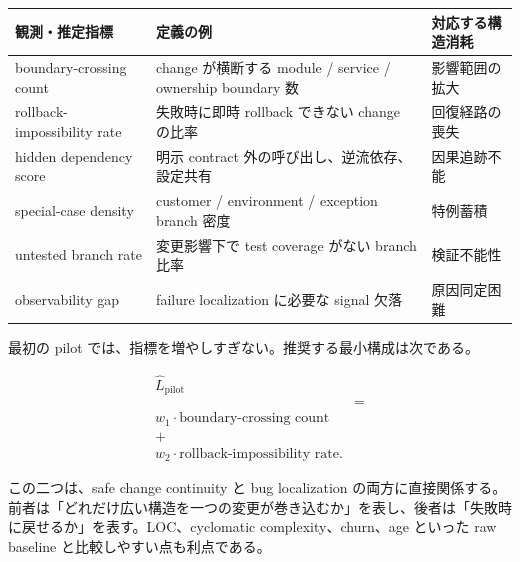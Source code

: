 \documentclass[12pt,a4paper]{article}
\begin{document}
{\def\LTcaptype{table} %
\begin{longtable}[]{@{}
  >{\raggedright\arraybackslash}p{}
  >{\raggedright\arraybackslash}p{}
  >{\raggedright\arraybackslash}p{}@{}}
\toprule\noalign{}
\begin{minipage}[b]{\linewidth}\raggedright
観測・推定指標
\end{minipage} & \begin{minipage}[b]{\linewidth}\raggedright
定義の例
\end{minipage} & \begin{minipage}[b]{\linewidth}\raggedright
対応する構造消耗
\end{minipage} \\
\midrule\noalign{}
\endhead
\bottomrule\noalign{}
\endlastfoot
boundary-crossing count & 1 change が横断する module / service / ownership boundary 数 & 影響範囲の拡大 \\
rollback-impossibility rate & 失敗時に即時 rollback できない change の比率 & 回復経路の喪失 \\
hidden dependency score & 明示 contract 外の呼び出し、逆流依存、設定共有 & 因果追跡不能 \\
special-case density & customer / environment / exception branch 密度 & 特例蓄積 \\
untested branch rate & 変更影響下で test coverage がない branch 比率 & 検証不能性 \\
observability gap & failure localization に必要な signal 欠落 & 原因同定困難 \\
\end{longtable}
}

最初の pilot では、指標を増やしすぎない。推奨する最小構成は次である。

\[
\begin{aligned}
\hat L_{\mathrm{pilot}} \\
&= \\
w_1 \cdot \text{boundary-crossing count} \\
+ \\
w_2 \cdot \text{rollback-impossibility rate}.
\end{aligned}
\]

この二つは、safe change continuity と bug localization の両方に直接関係する。前者は「どれだけ広い構造を一つの変更が巻き込むか」を表し、後者は「失敗時に戻せるか」を表す。LOC、cyclomatic complexity、churn、age といった raw baseline と比較しやすい点も利点である。
\end{document}
